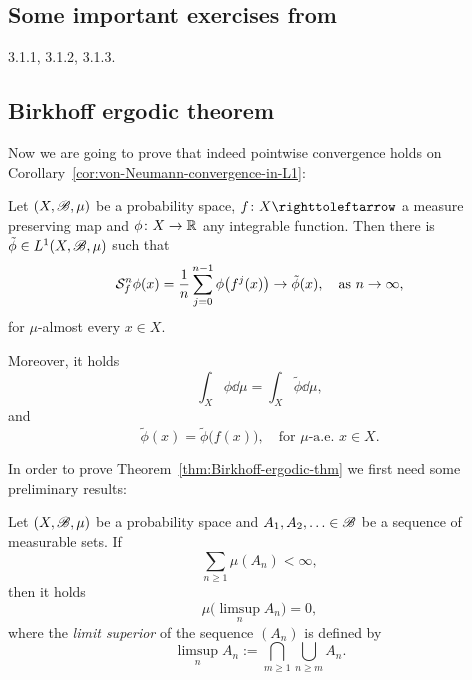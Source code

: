\subsection{Some important exercises from~\cite[\S3.1.4]{VianaOliveiraFoundErgTh}}
\label{sec:some-import-exerc-3.1.4}

3.1.1, 3.1.2, 3.1.3.


\subsection{Birkhoff ergodic theorem}
\label{sec:birkh-ergod-thm}

Now we are going to prove that indeed pointwise convergence holds on Corollary~\ref{cor:von-Neumann-convergence-in-L1}:

\begin{theorem}\label{thm:Birkhoff-ergodic-thm}
  Let $(X,\mathscr{B},\mu)$ be a probability space, $f\colon X\carr$ a measure preserving map and $\phi\colon X\to\mathbb{R}$ any integrable function. Then there is $\tilde\phi\in L^{1}(X,\mathscr{B},\mu)$ such that
  \begin{displaymath}
    \mathcal{S}_{f}^{n}\phi(x)=\frac{1}{n}\sum_{j=0}^{n-1}\phi\big(f^{j}(x)\big)\to\tilde\phi(x), \quad\text{as } n\to\infty,
  \end{displaymath}
  for $\mu$-almost every $x\in X$.

  Moreover, it holds
  \begin{displaymath}
    \int_{X}\phi\dd\mu = \int_{X}\tilde\phi\dd\mu,
  \end{displaymath}
  and
  \begin{displaymath}
    \tilde\phi(x)=\tilde\phi\big(f(x)\big), \quad\text{for }\mu\text{-a.e. } x\in X.
  \end{displaymath}
\end{theorem}

In order to prove Theorem~\ref{thm:Birkhoff-ergodic-thm} we first need some preliminary results:

\begin{lemma}\label{lem:Borel-Cantelli}
  Let $(X,\mathscr{B},\mu)$ be a probability space and $A_{1},A_{2},\ldots\in\mathscr{B}$ be a sequence of measurable sets. If
  \begin{displaymath}
    \sum_{n\geq 1}\mu(A_{n})<\infty,
  \end{displaymath}
  then it holds
  \begin{displaymath}
    \mu\Big(\limsup_{n}A_{n}\Big)=0,
  \end{displaymath}
  where the \emph{limit superior} of the sequence $(A_{n})$ is defined by
  \begin{displaymath}
    \limsup_{n} A_{n} := \bigcap_{m\geq 1}\bigcup_{n\geq m} A_{n}.
  \end{displaymath}
\end{lemma}

